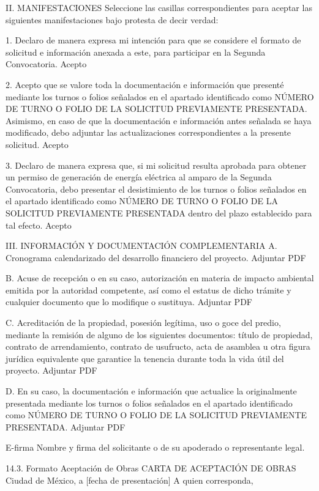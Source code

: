  
 
 
 
 
II. MANIFESTACIONES
Seleccione las casillas correspondientes para aceptar las siguientes manifestaciones bajo protesta de decir verdad:
 
 1. Declaro de manera expresa mi intención para que se considere el formato de solicitud e información anexada a este, para participar en la Segunda Convocatoria.
  Acepto
 
 2. Acepto que se valore toda la documentación e información que presenté mediante los turnos o folios señalados en el apartado identificado como NÚMERO DE TURNO O FOLIO DE LA SOLICITUD PREVIAMENTE PRESENTADA.
Asimismo, en caso de que la documentación e información antes señalada se haya modificado, debo adjuntar las actualizaciones correspondientes a la presente solicitud.
  Acepto
 
 3. Declaro de manera expresa que, si mi solicitud resulta aprobada para obtener un permiso de generación de energía eléctrica al amparo de la Segunda Convocatoria, debo presentar el desistimiento de los turnos o folios señalados en el apartado identificado como NÚMERO DE TURNO O FOLIO DE LA SOLICITUD PREVIAMENTE PRESENTADA dentro del plazo establecido para tal efecto.
  Acepto
 
 
III. INFORMACIÓN Y DOCUMENTACIÓN COMPLEMENTARIA
A. Cronograma calendarizado del desarrollo financiero del proyecto.
 Adjuntar PDF
 
 B. Acuse de recepción o en su caso, autorización en materia de impacto ambiental emitida por la autoridad competente, así como el estatus de dicho trámite y cualquier documento que lo modifique o sustituya.
 Adjuntar PDF
 
 C. Acreditación de la propiedad, posesión legítima, uso o goce del predio, mediante la remisión de alguno de los siguientes documentos: título de propiedad, contrato de arrendamiento, contrato de usufructo, acta de asamblea u otra figura jurídica equivalente que garantice la tenencia durante toda la vida útil del proyecto.
 Adjuntar PDF
 
 D. En su caso, la documentación e información que actualice la originalmente presentada mediante los turnos o folios señalados en el apartado identificado como NÚMERO DE TURNO O FOLIO DE LA SOLICITUD PREVIAMENTE PRESENTADA.
 Adjuntar PDF
 
 E-firma
Nombre y firma del solicitante o de su apoderado o representante legal.
 
 \par
14.3. Formato Aceptación de Obras
CARTA DE ACEPTACIÓN DE OBRAS
Ciudad de México, a [fecha de presentación]
A quien corresponda,

